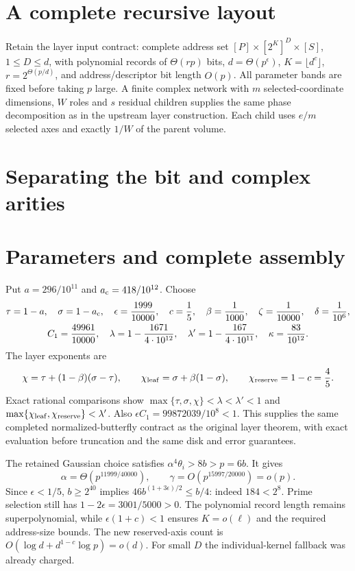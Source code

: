\documentclass[11pt]{article}
\begin{document}
\section{A complete recursive layout}
Retain the layer input contract: complete address set
$[P]\times[2^K]^D\times[S]$, $1\le D\le d$, with polynomial records of
$\Theta(rp)$ bits, $d=\Theta(p^\epsilon)$, $K=\lfloor d^c\rfloor$,
$r=2^{\Theta(p/d)}$, and address/descriptor bit length $O(p)$. All parameter
bands are fixed before taking $p$ large. A finite complex network with
$m$ selected-coordinate dimensions, $W$ roles and $s$ residual children
supplies the same phase decomposition as in the upstream layer construction.
Each child uses $e/m$ selected axes and exactly $1/W$ of the parent volume.



\section{Separating the bit and complex arities}


\section{Parameters and complete assembly}
Put $a=296/10^{11}$ and $a_{\rm c}=418/10^{12}$. Choose
\begin{gather*}
 \tau=1-a,\quad\sigma=1-a_{\rm c},\quad
 \epsilon=\frac{1999}{10000},\quad c=\frac15,\quad
 \beta=\frac1{1000},\quad\zeta=\frac1{10000},\quad\delta=\frac1{10^6},\\
 C_1=\frac{49961}{10000},\quad
 \lambda=1-\frac{1671}{4\cdot10^{12}},\quad
 \lambda'=1-\frac{167}{4\cdot10^{11}},\quad
 \kappa=\frac{83}{10^{12}}.
\end{gather*}
The layer exponents are
\[
 \chi=\tau+(1-\beta)(\sigma-\tau),\qquad
 \chi_{\rm leaf}=\sigma+\beta(1-\sigma),\qquad
 \chi_{\rm reserve}=1-c=\frac45.
\]
Exact rational comparisons show
$\max\{\tau,\sigma,\chi\}<\lambda<\lambda'<1$ and
$\max\{\chi_{\rm leaf},\chi_{\rm reserve}\}<\lambda'$.
Also $\epsilon C_1=99872039/10^8<1$. This supplies the same completed
normalized-butterfly contract as the original layer theorem, with exact
evaluation before truncation and the same disk and error guarantees.

The retained Gaussian choice satisfies
$\alpha^4\theta_i>8b>p=6b$. It gives
\[
 \alpha=\Theta(p^{11999/40000}),\qquad
 \gamma=O(p^{15997/20000})=o(p).
\]
Since $\epsilon<1/5$, $b\ge2^{40}$ implies
$46b^{(1+3\epsilon)/2}\le b/4$: indeed $184<2^8$.
Prime selection still has $1-2\epsilon=3001/5000>0$.
The polynomial record length remains superpolynomial, while
$\epsilon(1+c)<1$ ensures $K=o(\ell)$ and the required address-size bounds.
The new reserved-axis count is $O(\log d+d^{1-c}\log p)=o(d)$.
For small $D$ the individual-kernel fallback was already charged.
\end{document}
